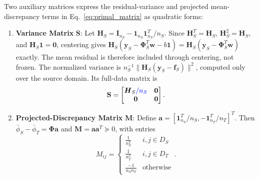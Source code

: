 \documentclass[a4paper]{cas-sc}
\begin{document}
{\color{blue}Two auxiliary matrices express the residual-variance and projected mean-discrepancy terms in Eq.~\eqref{eq:primal_matrix} as quadratic forms:}
\begin{enumerate}
    \item {\color{blue}\textbf{Variance Matrix} $\mathbf{S}$: Let $\boldsymbol{H}_S=\boldsymbol{I}_{n_S}-\boldsymbol{1}_{n_S}\boldsymbol{1}_{n_S}^T/n_S$. Since $\boldsymbol{H}_S^T=\boldsymbol{H}_S$, $\boldsymbol{H}_S^2=\boldsymbol{H}_S$, and $\boldsymbol{H}_S\boldsymbol{1}=\boldsymbol{0}$, centering gives $\boldsymbol{H}_S(\boldsymbol{y}_S-\boldsymbol{\Phi}_S^T\boldsymbol{w}-b\boldsymbol{1})=\boldsymbol{H}_S(\boldsymbol{y}_S-\boldsymbol{\Phi}_S^T\boldsymbol{w})$ exactly. The mean residual is therefore included through centering, not frozen. The normalized variance is $n_S^{-1}\|\boldsymbol{H}_S(\boldsymbol{y}_S-\boldsymbol{f}_S)\|^2$, computed only over the source domain. Its full-data matrix is}
    \begin{equation}
    \label{eq:matrix_S}
    \mathbf{S} = \begin{bmatrix} \boldsymbol{H}_S{\color{blue}/n_S} & \mathbf{0} \\ \mathbf{0} & \mathbf{0} \end{bmatrix}.
    \end{equation}
    \item {\color{blue}\textbf{Projected-Discrepancy Matrix} $\mathbf{M}$: Define $\boldsymbol{a}=[\boldsymbol{1}_{n_S}^T/n_S,-\boldsymbol{1}_{n_T}^T/n_T]^T$. Then $\bar\phi_S-\bar\phi_T=\boldsymbol{\Phi}\boldsymbol{a}$ and $\mathbf{M}=\boldsymbol{a}\boldsymbol{a}^T\succeq0$, with entries}
    \begin{equation}
    \label{eq:matrix_M}
    M_{ij} = \begin{cases} \frac{1}{n_S^2} & i,j \in D_S \\ \frac{1}{n_T^2} & i,j \in D_T \\ \frac{-1}{n_S n_T} & \text{otherwise} \end{cases}.
    \end{equation}
\end{enumerate}
\end{document}
